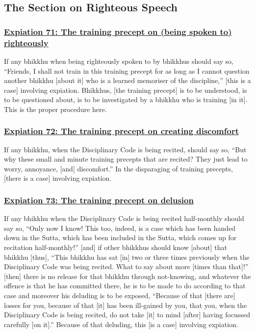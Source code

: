 \subsection{The Section on Righteous Speech}
\label{exp-vagga8}

\subsubsection*{\hyperref[pac71]{Expiation 71: The training precept on (being spoken to) righteously}}
\label{exp71}
If any bhikkhu when being righteously spoken to by bhikkhus should say so, ``Friends, I shall not train in this training precept for as long as I cannot question another bhikkhu [about it] who is a learned memoriser of the discipline,'' [this is a case] involving expiation. Bhikkhus, [the training precept] is to be understood, is to be questioned about, is to be investigated by a bhikkhu who is training [in it]. This is the proper procedure here.



\subsubsection*{\hyperref[pac72]{Expiation 72: The training precept on creating discomfort}}
\label{exp72}
If any bhikkhu, when the Disciplinary Code is being recited, should say so, ``But why these small and minute training precepts that are recited? They just lead to worry, annoyance, [and] discomfort.'' In the disparaging of training precepts, [there is a case] involving expiation.



\subsubsection*{\hyperref[pac73]{Expiation 73: The training precept on delusion}}
\label{exp73}
If any bhikkhu when the Disciplinary Code is being recited half-monthly should say so, ``Only now I know! This too, indeed, is a case which has been handed down in the Sutta, which has been included in the Sutta, which comes up for recitation half-monthly!'' [and] if other bhikkhus should know [about] that bhikkhu [thus], ``This bhikkhu has sat [in] two or three times previously when the Disciplinary Code was being recited. What to say about more [times than that]!'' [then] there is no release for that bhikkhu through not-knowing, and whatever the offence is that he has committed there, he is to be made to do according to that case and moreover his deluding is to be exposed, ``Because of that [there are] losses for you, because of that [it] has been ill-gained by you, that you, when the Disciplinary Code is being recited, do not take [it] to mind [after] having focussed carefully [on it].'' Because of that deluding, this [is a case] involving expiation.



